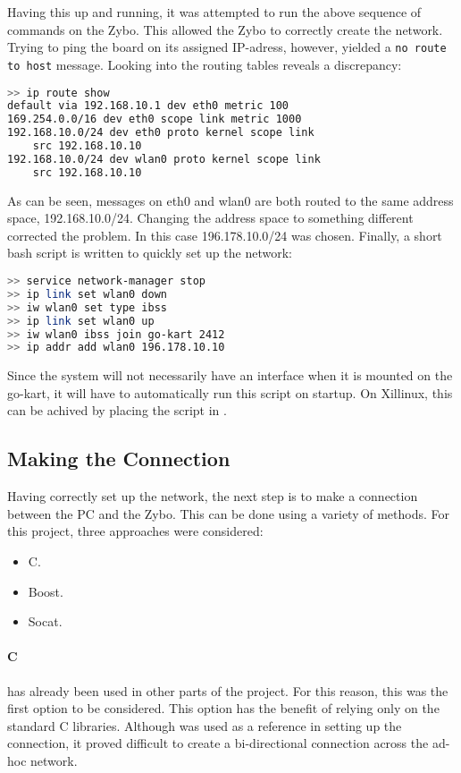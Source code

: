 Having this up and running, it was attempted to run the above sequence of commands on the Zybo.
This allowed the Zybo to correctly create the network.
Trying to ping the board on its assigned IP-adress, however, yielded a \texttt{no route to host} message.
Looking into the routing tables reveals a discrepancy:
\begin{lstlisting}[language=bash]
>> ip route show
default via 192.168.10.1 dev eth0 metric 100 
169.254.0.0/16 dev eth0 scope link metric 1000 
192.168.10.0/24 dev eth0 proto kernel scope link 
	src 192.168.10.10 
192.168.10.0/24 dev wlan0 proto kernel scope link 
	src 192.168.10.10
\end{lstlisting}
As can be seen, messages on eth0 and wlan0 are both routed to the same address space, 192.168.10.0/24.
Changing the address space to something different corrected the problem.
In this case 196.178.10.0/24 was chosen.
Finally, a short bash script is written to quickly set up the network:
\begin{lstlisting}[language=bash]
>> service network-manager stop
>> ip link set wlan0 down
>> iw wlan0 set type ibss
>> ip link set wlan0 up
>> iw wlan0 ibss join go-kart 2412
>> ip addr add wlan0 196.178.10.10
\end{lstlisting}

Since the system will not necessarily have an interface when it is mounted on the go-kart, it will have to automatically run this script on startup.
On Xillinux, this can be achived by placing the script in .

\subsection{Making the Connection}
Having correctly set up the network, the next step is to make a connection between the PC and the Zybo.
This can be done using a variety of methods.
For this project, three approaches were considered:

\begin{itemize}
	\item C.
	\item Boost.
	\item Socat.
\end{itemize}

\paragraph*{C}has already been used in other parts of the project.
For this reason, this was the first option to be considered.
This option has the benefit of relying only on the standard C libraries.
Although \cite{beej} was used as a reference in setting up the connection, it proved difficult to create a bi-directional connection across the ad-hoc network.

